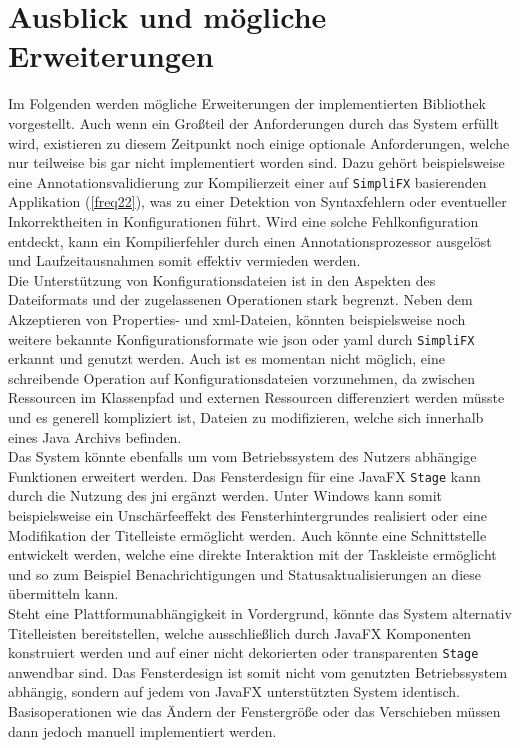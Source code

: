 \section{Ausblick und mögliche Erweiterungen}
\label{ausblick_und_mögliche_erweiterungen}
Im Folgenden werden mögliche Erweiterungen der implementierten Bibliothek vorgestellt. Auch wenn ein Großteil der Anforderungen durch das System erfüllt wird, existieren zu diesem Zeitpunkt noch einige optionale Anforderungen, welche nur teilweise bis gar nicht implementiert worden sind. Dazu gehört beispielsweise eine Annotationsvalidierung zur Kompilierzeit einer auf \texttt{SimpliFX} basierenden Applikation (\autoref{freq22}), was zu einer Detektion von Syntaxfehlern oder eventueller Inkorrektheiten in Konfigurationen führt. Wird eine solche Fehlkonfiguration entdeckt, kann ein Kompilierfehler durch einen Annotationsprozessor ausgelöst und Laufzeitausnahmen somit effektiv vermieden werden.\\
Die Unterstützung von Konfigurationsdateien ist in den Aspekten des Dateiformats und der zugelassenen Operationen stark begrenzt. Neben dem Akzeptieren von Properties- und \ac{xml}-Dateien, könnten beispielsweise noch weitere bekannte Konfigurationsformate wie \ac{json} oder \ac{yaml} durch \texttt{SimpliFX} erkannt und genutzt werden. Auch ist es momentan nicht möglich, eine schreibende Operation auf Konfigurationsdateien vorzunehmen, da zwischen Ressourcen im Klassenpfad und externen Ressourcen differenziert werden müsste und es generell kompliziert ist, Dateien zu modifizieren, welche sich innerhalb eines Java Archivs befinden.\\
Das System könnte ebenfalls um vom Betriebssystem des Nutzers abhängige Funktionen erweitert werden. Das Fensterdesign für eine JavaFX \texttt{Stage} kann durch die Nutzung des \ac{jni} ergänzt werden. Unter Windows kann somit beispielsweise ein Unschärfeeffekt des Fensterhintergrundes realisiert oder eine Modifikation der Titelleiste ermöglicht werden. Auch könnte eine Schnittstelle entwickelt werden, welche eine direkte Interaktion mit der Taskleiste ermöglicht und so zum Beispiel Benachrichtigungen und Statusaktualisierungen an diese übermitteln kann.\\
Steht eine Plattformunabhängigkeit in Vordergrund, könnte das System alternativ Titelleisten bereitstellen, welche ausschließlich durch JavaFX Komponenten konstruiert werden und auf einer nicht dekorierten oder transparenten \texttt{Stage} anwendbar sind. Das Fensterdesign ist somit nicht vom genutzten Betriebssystem abhängig, sondern auf jedem von JavaFX unterstützten System identisch. Basisoperationen wie das Ändern der Fenstergröße oder das Verschieben müssen dann jedoch manuell implementiert werden.\\
